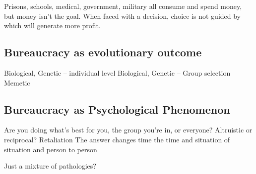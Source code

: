 Prisons, schools, medical, government, military all consume and spend money, but money isn't the goal. When faced with a decision, choice is not guided by which will generate more profit. 


\subsection{Bureaucracy as evolutionary outcome}

Biological, Genetic -- individual level
Biological, Genetic -- Group selection
Memetic

\subsection{Bureaucracy as Psychological Phenomenon}

Are you doing what's best for you, the group you're in, or everyone?
Altruistic or reciprocal? Retaliation
The answer changes time the time and situation of situation and person to person

Just a mixture of pathologies?